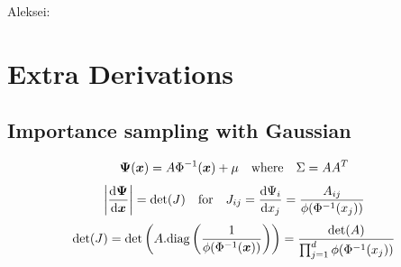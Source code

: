 \documentclass[graybox,footinfo]{svmult}
\newcommand{\AGSComment}[1]{{\color{cyan} Aleksei: #1}}
\begin{document}
\iffalse
\AGSComment{

\section{Extra Derivations}

\subsection{Importance sampling with Gaussian}

$$ {\boldsymbol{\Psi}}({\boldsymbol{x}}) = A\Phi^{-1}({\boldsymbol{x}}) + \mu \quad \text{where} \quad \Sigma = AA^T$$
$$ \left\lvert \frac{\mathrm{d} {\boldsymbol{\Psi}}}{\mathrm{d} {\boldsymbol{x}}} \right\rvert = \det(J) \quad \text{for} \quad J_{ij} = \frac{\mathrm{d} \Psi_i}{\mathrm{d} x_j} = \frac{A_{ij}}{\phi(\Phi^{-1}(x_j))}$$
$$ \det(J) = \det\left(A . \text{diag}\left(\frac{1}{\phi(\Phi^{-1}({\boldsymbol{x}}))}\right)\right) = \frac{\det(A)}{\prod_{j=1}^d \phi(\Phi^{-1}(x_j))}$$}
\end{document}
